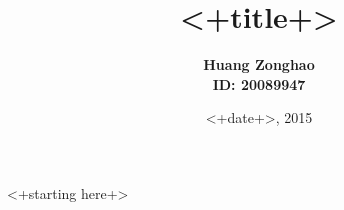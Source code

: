 \documentclass[12pt,a4paper]{article}
\begin{document}
\title{\textbf {<+title+>}}
\author{\textbf{Huang Zonghao}\\ 
\textbf{ID: 20089947}}
\date{<+date+>, 2015}
\maketitle
<+starting here+>

 
\end{document}
